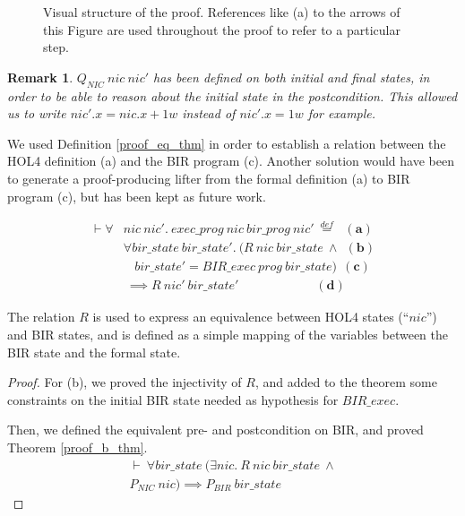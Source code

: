 \documentclass[10pt,a4paper]{article}
\newcommand{\eqdef}{\stackrel{def}{=}}
\newtheorem{remark}{Remark}
\begin{document}
\begin{multicols}{2}
\begin{figure}[H]
	\centering
	\caption{Visual structure of the proof. References like (a) to the arrows of this Figure are used throughout the proof to refer to a particular step.}
	\label{proof_schema}
\end{figure}
%
\begin{remark} \label{remark_Q_nic_intial_final}
$Q_{NIC}~nic~nic'$ has been defined on both initial and final states, in order to be able to reason about the initial state in the postcondition. This allowed us to write $nic'.x = nic.x + 1w$ instead of $nic'.x = 1w$ for example.
\end{remark}
%
\par We used Definition \ref{proof_eq_thm} in order to establish a relation between the HOL4 definition (a) and the BIR program (c). Another solution would have been to generate a proof-producing lifter from the formal definition (a) to BIR program (c), but has been kept as future work.
%
\begin{small}
  \begin{equation}
  \begin{split}
    \vdash \forall &nic~nic'.~exec\_prog~nic~bir\_prog~nic'~\eqdef ~~\, \mathbf{(a)}\\
      &\forall bir\_state~bir\_state'.~(R~nic~bir\_state~\land ~~ \mathbf{(b)}\\
            &~~~~bir\_state' = BIR\_exec~prog~bir\_state) ~~ \mathbf{(c)}\\
            &~\implies R~nic'~bir\_state' ~~~~~~~~~~~~~~~~~~~~~~~~~~~\, \mathbf{(d)}
  \end{split}
  \label{proof_eq_thm}
  \end{equation}
\end{small}
%
\vspace{-5pt}
\par The relation $R$ is used to express an equivalence between HOL4 states (``$nic$'') and BIR states, and is defined as a simple mapping of the variables between the BIR state and the formal state.

\begin{proof}

For (b), we proved the injectivity of $R$, and added to the theorem some constraints on the initial BIR state needed as hypothesis for $BIR\_exec$.

Then, we defined the equivalent pre- and postcondition on BIR, and proved Theorem \ref{proof_b_thm}.
%
\begin{equation} \label{proof_b_thm}
  \begin{split}
  \vdash~\forall bir\_state~(\exists nic.~R~nic~bir\_state~\land\\
  P_{NIC}~nic) \implies P_{BIR}~bir\_state
  \end{split}
\end{equation}
  

\end{proof}
\end{multicols}
\end{document}
